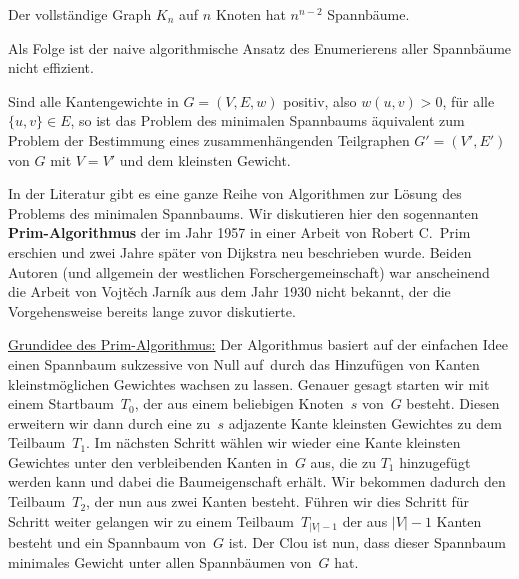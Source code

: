 \begin{thm}[Cayley]
Der vollständige Graph $K_n$ auf $n$ Knoten hat $n^{n-2}$ Spannbäume.
\end{thm}
Als Folge ist der naive algorithmische Ansatz des Enumerierens aller Spannbäume nicht effizient.


\begin{bem}
Sind alle Kantengewichte in $G=(V,E,w)$ positiv, also $w(u,v) > 0$, für alle $\{u,v\} \in E$, so ist das Problem des minimalen Spannbaums äquivalent zum Problem der Bestimmung eines zusammenhängenden Teilgraphen $G'= (V',E')$ von $G$ mit $V=V'$ und dem kleinsten Gewicht.
\end{bem}

\begin{bem} 
In der Literatur gibt es eine ganze Reihe von Algorithmen zur Lösung des Problems des minimalen Spannbaums.
Wir diskutieren hier den sogennanten \textbf{Prim-Algorithmus} der im Jahr 1957 in einer Arbeit von Robert C.~Prim erschien und zwei Jahre später von Dijkstra neu beschrieben wurde.
Beiden Autoren (und allgemein der westlichen Forschergemeinschaft) war anscheinend die Arbeit von Vojt\v{e}ch Jarn\'{i}k aus dem Jahr 1930 nicht bekannt, der die Vorgehensweise bereits lange zuvor diskutierte.
\end{bem} 

\begin{bem}
\underline{Grundidee des Prim-Algorithmus:}
Der Algorithmus basiert auf der einfachen Idee einen Spannbaum sukzessive \glqq von Null auf\grqq\ durch das Hinzufügen von Kanten kleinstmöglichen Gewichtes wachsen zu lassen.
Genauer gesagt starten wir mit einem Startbaum~$T_0$, der aus einem beliebigen Knoten~$s$ von~$G$ besteht.
Diesen erweitern wir dann durch eine zu~$s$ adjazente Kante kleinsten Gewichtes zu dem Teilbaum~$T_1$.
Im nächsten Schritt wählen wir wieder eine Kante kleinsten Gewichtes unter den verbleibenden Kanten in~$G$ aus, die zu $T_1$ hinzugefügt werden kann und dabei die Baumeigenschaft erhält.
Wir bekommen dadurch den Teilbaum~$T_2$, der nun aus zwei Kanten besteht.
Führen wir dies Schritt für Schritt weiter gelangen wir zu einem Teilbaum~$T_{|V|-1}$ der aus $|V|-1$ Kanten besteht und ein Spannbaum von~$G$ ist.
Der Clou ist nun, dass dieser Spannbaum minimales Gewicht unter allen Spannbäumen von~$G$ hat.
\end{bem} 


